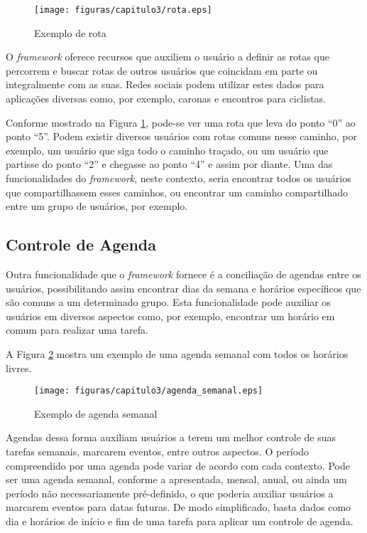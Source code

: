 \begin{figure}[!h]
	\centering
	\texttt{[image: figuras/capitulo3/rota.eps]}
	\caption[Exemplo de rota]{Exemplo de rota\footnotemark}
	\label{rota}
\end{figure}

O \textit{framework} oferece recursos que auxiliem o usuário a definir as rotas que percorrem e buscar rotas de outros usuários que coincidam em parte ou integralmente com as suas. Redes sociais podem utilizar estes dados para aplicações diversas como, por exemplo, caronas e encontros para ciclistas.

Conforme mostrado na Figura \ref{rota}, pode-se ver uma rota que leva do ponto ``0'' ao ponto ``5''. Podem existir diversos usuários com rotas comuns nesse caminho, por exemplo, um usuário que siga todo o caminho traçado, ou um usuário que partisse do ponto ``2'' e chegasse ao ponto ``4'' e assim por diante. Uma das funcionalidades do \textit{framework}, neste contexto, seria encontrar todos os usuários que compartilhassem esses caminhos, ou encontrar um caminho compartilhado entre um grupo de usuários, por exemplo.

\subsection{Controle de Agenda}

Outra funcionalidade que o \textit{framework} fornece é a conciliação de agendas entre os usuários, possibilitando assim encontrar dias da semana e horários específicos que são comuns a um determinado grupo. Esta funcionalidade pode auxiliar os usuários em diversos aspectos como, por exemplo, encontrar um horário em comum para realizar uma tarefa.

A Figura \ref{agenda semanal} mostra um exemplo de uma agenda semanal com todos os horários livres.

\begin{figure}[!h]
	\centering
	\texttt{[image: figuras/capitulo3/agenda\_semanal.eps]}
	\caption[Exemplo de agenda semanal]{Exemplo de agenda semanal\footnotemark}
	\label{agenda semanal}
\end{figure}

Agendas dessa forma auxiliam usuários a terem um melhor controle de suas tarefas semanais, marcarem eventos, entre outros aspectos. O período compreendido por uma agenda pode variar de acordo com cada contexto. Pode ser uma agenda semanal, conforme a apresentada, mensal, anual, ou ainda um período não necessariamente pré-definido, o que poderia auxiliar usuários a marcarem eventos para datas futuras. De modo simplificado, basta dados como dia e horários de início e fim de uma tarefa para aplicar um controle de agenda.

